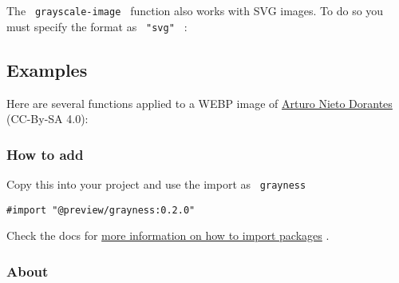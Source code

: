 The \texttt{\ grayscale-image\ } function also works with SVG images. To
do so you must specify the format as \texttt{\ "svg"\ } :

\begin{Shaded}
\begin{Highlighting}[]
\end{Highlighting}
\end{Shaded}

\subsection{Examples}\label{examples}

Here are several functions applied to a WEBP image of
\href{https://commons.wikimedia.org/wiki/File:Arturo_Nieto-Dorantes.webp}{Arturo
Nieto Dorantes} (CC-By-SA 4.0):

\subsubsection{How to add}\label{how-to-add}

Copy this into your project and use the import as \texttt{\ grayness\ }

\begin{verbatim}
#import "@preview/grayness:0.2.0"
\end{verbatim}



Check the docs for
\href{https://typst.app/docs/reference/scripting/\#packages}{more
information on how to import packages} .

\subsubsection{About}\label{about}

